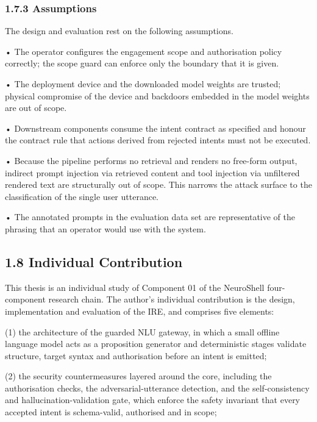 \documentclass[
]{article}
\begin{document}
\hypertarget{assumptions}{%
\subsubsection{1.7.3 Assumptions}\label{assumptions}}

The design and evaluation rest on the following assumptions.

• The operator configures the engagement scope and authorisation policy
correctly; the scope guard can enforce only the boundary that it is
given.

• The deployment device and the downloaded model weights are trusted;
physical compromise of the device and backdoors embedded in the model
weights are out of scope.

• Downstream components consume the intent contract as specified and
honour the contract rule that actions derived from rejected intents must
not be executed.

• Because the pipeline performs no retrieval and renders no free-form
output, indirect prompt injection via retrieved content and tool
injection via unfiltered rendered text are structurally out of scope.
This narrows the attack surface to the classification of the single user
utterance.

• The annotated prompts in the evaluation data set are representative of
the phrasing that an operator would use with the system.

\hypertarget{individual-contribution}{%
\subsection{1.8 Individual Contribution}\label{individual-contribution}}

This thesis is an individual study of Component 01 of the NeuroShell
four-component research chain. The author's individual contribution is
the design, implementation and evaluation of the IRE, and comprises five
elements:

(1) the architecture of the guarded NLU gateway, in which a small
offline language model acts as a proposition generator and deterministic
stages validate structure, target syntax and authorisation before an
intent is emitted;

(2) the security countermeasures layered around the core, including the
authorisation checks, the adversarial-utterance detection, and the
self-consistency and hallucination-validation gate, which enforce the
safety invariant that every accepted intent is schema-valid, authorised
and in scope;
\end{document}
